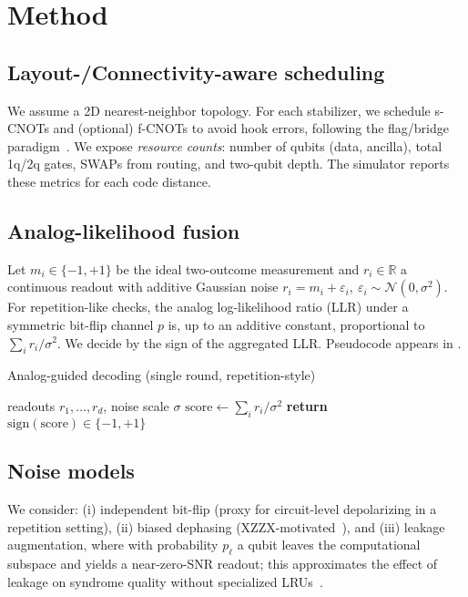 \documentclass[11pt]{article}
\begin{document}
\section{Method}
\subsection{Layout-/Connectivity-aware scheduling} \label{sec:layout}
We assume a 2D nearest-neighbor topology. For each stabilizer, we schedule s-CNOTs and (optional) f-CNOTs to avoid hook errors, following the flag/bridge paradigm~\cite{ChamberlandBeverland2018,LaoAlmudever2020}. We expose
\emph{resource counts}: number of qubits (data, ancilla), total 1q/2q gates, SWAPs from routing, and two-qubit depth. The simulator reports these metrics for each code distance.

\subsection{Analog-likelihood fusion} \label{sec:analog}
Let $m_i\in\{-1,+1\}$ be the ideal two-outcome measurement and $r_i \in \mathbb{R}$ a continuous readout with additive Gaussian noise $r_i=m_i+\varepsilon_i,\ \varepsilon_i\sim \mathcal{N}(0,\sigma^2)$. For repetition-like checks, the analog log-likelihood ratio (LLR) under a symmetric bit-flip channel $p$ is, up to an additive constant, proportional to $\sum_i r_i/\sigma^2$. We decide by the sign of the aggregated LLR. Pseudocode appears in .

\begin{algorithm}[H]
\caption{Analog-guided decoding (single round, repetition-style)}\label{alg:analog}
\begin{algorithmic}[1]
\Require readouts $r_1,\dots,r_d$, noise scale $\sigma$
\State $\text{score} \gets \sum_i r_i/\sigma^2$
\State \textbf{return} $\mathrm{sign}(\text{score}) \in \{-1,+1\}$
\end{algorithmic}
\end{algorithm}

\subsection{Noise models}
We consider: (i) independent bit-flip (proxy for circuit-level depolarizing in a repetition setting), (ii) biased dephasing (XZZX-motivated~\cite{XZZXNatComms2021}), and (iii) leakage augmentation, where with probability $p_\ell$ a qubit leaves the computational subspace and yields a near-zero-SNR readout; this approximates the effect of leakage on syndrome quality without specialized LRUs~\cite{McEwenLeakage2021,LRUAllMWPRL2023}.
\end{document}
